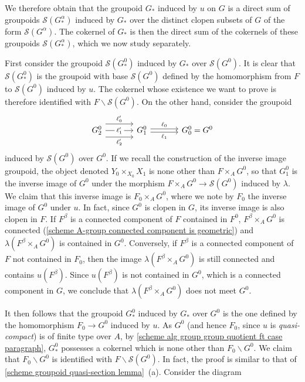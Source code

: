 We therefore obtain that the groupoid $G_*$ induced by $u$ on $G$ is a direct sum of groupoids $\mathcal{S}(G_*^\alpha)$ induced by $G_*$ over the distinct clopen subsets of $G$ of the form $\mathcal{S}(G^\alpha)$. The cokernel of $G_*$ is then the direct sum of the cokernels of these groupoids $\mathcal{S}(G^\alpha_*)$, which we now study separately.\par
First consider the groupoid $\mathcal{S}(G^0_*)$ induced by $G_*$ over $\mathcal{S}(G^0)$. It is clear that $\mathcal{S}(G^0_*)$ is the groupoid with base $\mathcal{S}(G^0)$ defined by the homomorphism from $F$ to $\mathcal{S}(G^0)$ induced by $u$. The cokernel whose existence we want to prove is therefore identified with $F\backslash\mathcal{S}(G^0)$. On the other hand, consider the groupoid
\[\begin{tikzcd}[column sep=12mm]
G^0_2\ar[r,shift left=8pt,"\ell_0'"]\ar[r,shift right=8pt,swap,"\ell_2'"]\ar[r,"\ell_1'"description]&G^0_1\ar[r,shift left=2pt,"\ell_0"]\ar[r,shift right=2pt,swap,"\ell_1"]&G_0^0=G^0
\end{tikzcd}\]
induced by $\mathcal{S}(G^0)$ over $G^0$. If we recall the construction of the inverse image groupoid, the object denoted $Y_0\times_{X_0}X_1$ is none other than $F\times_AG^0$, so that $G^0_1$ is the inverse image of $G^0$ under the morphism $F\times_AG^0\to\mathcal{S}(G^0)$ induced by $\lambda$. 
We claim that this inverse image is $F_0\times_AG^0$, where we note by $F_0$ the inverse image of $G^0$ under $u$. In fact, since $G^0$ is clopen in $G$, its inverse image is also clopen in $F$. If $F^\beta$ is a connected component of $F$ contained in $F^0$, $F^\beta\times_AG^0$ is connected (\cref{scheme A-group connected component is geometric}) and $\lambda(F^\beta\times_AG^0)$ is contained in $G^0$. Conversely, if $F^\beta$ is a connected component of $F$ not contained in $F_0$, then the image $\lambda(F^\beta\times_AG^0)$ is still connected and contains $u(F^\beta)$. Since $u(F^\beta)$ is not contained in $G^0$, which is a connected component in $G$, we conclude that $\lambda(F^\beta\times_AG^0)$ does not meet $G^0$.\par
It then follows that the groupoid $G^0_*$ induced by $G_*$ over $G^0$ is the one defined by the homomorphism $F_0\to G^0$ induced by $u$. As $G^0$ (and hence $F_0$, since $u$ is \textit{quasi-compact}) is of finite type over $A$, by \ref{scheme alg group group quotient ft case paragraph}, $G_*^0$ possesses a cokernel which is none other than $F_0\backslash G^0$. We claim that $F_0\backslash G^0$ is identified with $F\backslash\mathcal{S}(G^0)$. In fact, the proof is similar to that of \cref{scheme groupoid quasi-section lemma}~(a). Consider the diagram
